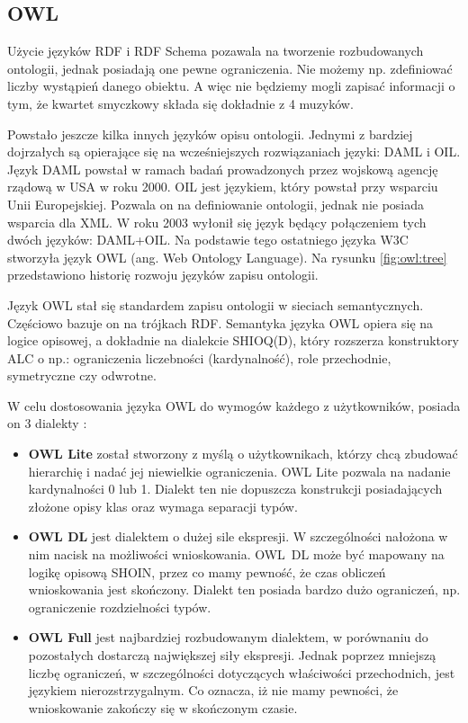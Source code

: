 \subsection*{OWL}


Użycie języków RDF i RDF Schema pozawala na tworzenie rozbudowanych ontologii, jednak posiadają one pewne ograniczenia. Nie możemy np. zdefiniować liczby wystąpień danego
obiektu. A więc nie będziemy mogli zapisać informacji o tym, że kwartet smyczkowy składa się dokładnie z 4 muzyków. 
\par
Powstało jeszcze kilka innych języków opisu ontologii. Jednymi z bardziej dojrzałych są opierające się na wcześniejszych rozwiązaniach języki: DAML i OIL. 
Język DAML powstał w ramach badań prowadzonych przez wojskową agencję rządową w USA w roku 2000. OIL jest językiem, który powstał przy wsparciu Unii Europejskiej. Pozwala on 
na definiowanie ontologii, jednak nie posiada wsparcia dla XML.  W roku 2003 wyłonił się język będący połączeniem tych dwóch języków: DAML+OIL. Na podstawie tego  
ostatniego języka W3C stworzyła język OWL (ang. Web Ontology Language). Na rysunku \ref{fig:owl:tree} przedstawiono historię rozwoju języków zapisu ontologii.

Język OWL stał się standardem zapisu ontologii w sieciach semantycznych. Częściowo bazuje on na trójkach RDF. Semantyka języka OWL opiera się na logice opisowej,
a dokładnie na dialekcie SHIOQ(D), który rozszerza konstruktory ALC o np.: ograniczenia liczebności (kardynalność), role przechodnie, symetryczne czy odwrotne. 

 
W celu dostosowania języka OWL do wymogów każdego z użytkowników, posiada on 3 dialekty \cite{owl_rek,owl_rek1}:
\begin{itemize}
 \item {\bf OWL Lite} 
został stworzony z myślą o użytkownikach, którzy chcą zbudować hierarchię i nadać jej niewielkie ograniczenia. OWL Lite pozwala na nadanie kardynalności 0 lub 1. 
Dialekt ten nie dopuszcza konstrukcji posiadających złożone opisy klas oraz wymaga separacji typów.  
  \item {\bf OWL DL}
jest dialektem  o dużej sile ekspresji. 
W szczególności nałożona w nim nacisk na możliwości wnioskowania. OWL~DL może być mapowany na logikę opisową SHOIN, przez co mamy pewność, że czas obliczeń wnioskowania 
jest skończony. Dialekt ten posiada bardzo dużo ograniczeń, np. ograniczenie rozdzielności  typów. 
 

  \item {\bf OWL Full}
jest najbardziej rozbudowanym dialektem, w porównaniu do pozostałych dostarczą największej siły ekspresji. Jednak poprzez mniejszą liczbę ograniczeń, w szczególności 
dotyczących właściwości przechodnich, jest językiem nierozstrzygalnym. Co oznacza, iż nie mamy pewności, że wnioskowanie zakończy się w skończonym czasie. 
\end{itemize}


